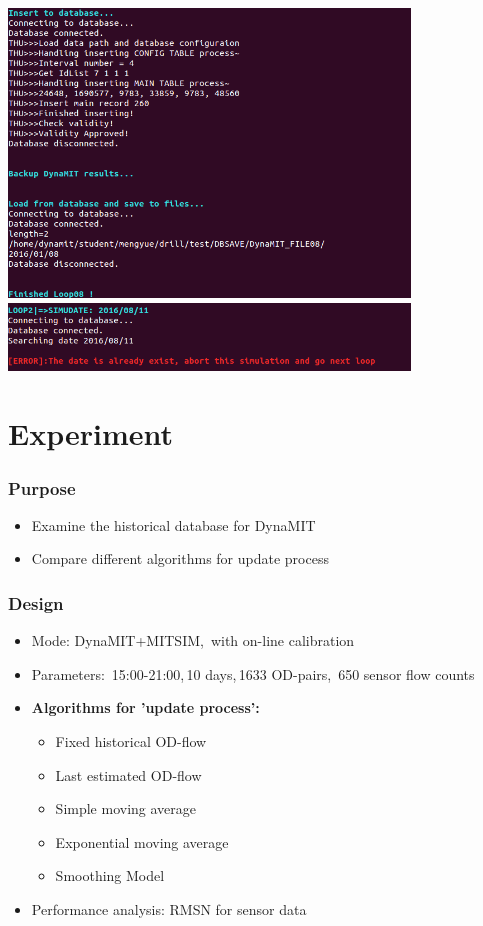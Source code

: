 \documentclass[12pt]{beamer}
\begin{document}
\begin{frame}
\includegraphics[width=0.8\textwidth]
{scst_5.png}
\vspace{0.1in}
\includegraphics[width = 0.8\textwidth]{scst_6.png}
\end{frame}
\section{Experiment}

\begin{frame}
\frametitle{Purpose}
\begin{itemize}
\item Examine the historical database for DynaMIT
\vspace{0.3in}
\item Compare different algorithms for update process
\end{itemize}
\end{frame}


\begin{frame}
\frametitle{Design}
\begin{itemize}
\item Mode: DynaMIT+MITSIM,\, with on-line calibration
\item Parameters: \,15:00-21:00,\,10 days,\,1633 OD-pairs,\, 650 sensor flow counts
\item \textbf{Algorithms for 'update process':}
\begin{itemize}
\item Fixed historical OD-flow
\item Last estimated OD-flow
\item Simple moving average
\item Exponential moving average
\item Smoothing Model
\end{itemize}
\item Performance analysis: RMSN for sensor data
\end{itemize}
\end{frame}
\end{document}
